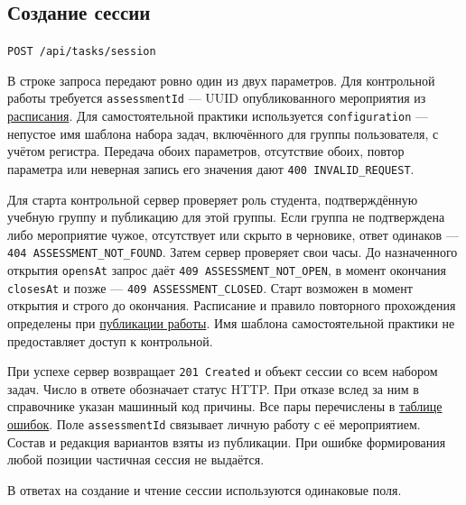 \documentclass[12pt,a4paper]{article}
\begin{document}
\subsection{Создание сессии}\label{1-ux441ux43eux437ux434ux430ux43dux438ux435-ux441ux435ux441ux441ux438ux438}

\hypertarget{1-создание-сессии}{}

\texttt{POST /\allowbreak{}api/\allowbreak{}tasks/\allowbreak{}session}

В строке запроса передают ровно один из двух параметров. Для контрольной работы требуется \texttt{assessment\allowbreak{}Id} --- UUID опубликованного мероприятия из {\hyperlink{расписание-студента}{расписания}}. Для самостоятельной практики используется \texttt{configuration} --- непустое имя шаблона набора задач, включённого для группы пользователя, с учётом регистра. Передача обоих параметров, отсутствие обоих, повтор параметра или неверная запись его значения дают \texttt{400 INVALID\_\allowbreak{}REQUEST}.

Для старта контрольной сервер проверяет роль студента, подтверждённую учебную группу и публикацию для этой группы. Если группа не подтверждена либо мероприятие чужое, отсутствует или скрыто в черновике, ответ одинаков --- \texttt{404 ASSESSMENT\_\allowbreak{}NOT\_\allowbreak{}FOUND}. Затем сервер проверяет свои часы. До назначенного открытия \texttt{opensAt} запрос даёт \texttt{409 ASSESSMENT\_\allowbreak{}NOT\_\allowbreak{}OPEN}, в момент окончания \texttt{closesAt} и позже --- \texttt{409 ASSESSMENT\_\allowbreak{}CLOSED}. Старт возможен в момент открытия и строго до окончания. Расписание и правило повторного прохождения определены при {\hyperlink{назначение-группе-и-публикация}{публикации работы}}. Имя шаблона самостоятельной практики не предоставляет доступ к контрольной.

При успехе сервер возвращает \texttt{201\ Created} и объект сессии со всем набором задач. Число в ответе обозначает статус HTTP. При отказе вслед за ним в справочнике указан машинный код причины. Все пары перечислены в {\hyperlink{4-ошибки}{таблице ошибок}}. Поле \texttt{assessment\allowbreak{}Id} связывает личную работу с её мероприятием. Состав и редакция вариантов взяты из публикации. При ошибке формирования любой позиции частичная сессия не выдаётся.

В ответах на создание и чтение сессии используются одинаковые поля.
\end{document}
